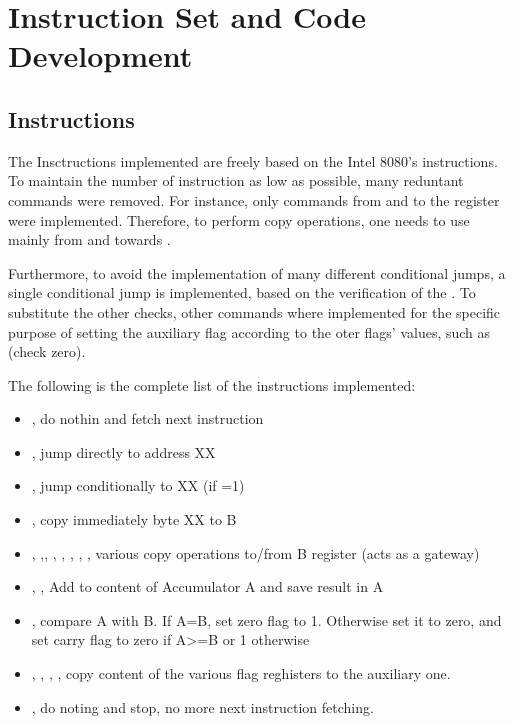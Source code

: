 \section{Instruction Set and Code Development} \label{sec:code}
\subsection{Instructions}
The Insctructions implemented are freely based on the Intel 8080's instructions.
To maintain the number of instruction as low as possible, many reduntant commands were removed.
For instance, only  commands from and to the  register
were implemented. Therefore, to perform copy operations, one needs to use mainly  from and towards .

Furthermore, to avoid the implementation of many different conditional jumps,
a single  conditional jump is implemented, based on the verification of the .
To substitute the other checks, other commands where implemented for the specific purpose of setting the
auxiliary flag according to the oter flags' values, such as  (check zero).

The following is the complete list of the instructions implemented:
\begin{itemize}
    \item {}, do nothin and fetch next instruction
    \item {}, jump directly to address XX
    \item {}, jump conditionally to XX (if =1)
    \item {}, copy immediately byte XX to B
    \item {}, ,, 
    , , , , , 
    various copy operations to/from B register (acts as a gateway)
    \item {}, , Add to content of Accumulator A and save result in A
    \item {}, compare A with B. If A=B, set zero flag to 1. Otherwise set it to zero, and set carry flag to zero if A>=B
    or 1 otherwise
    \item {}, , , , copy content of the various flag reghisters to the auxiliary one.
    \item {}, do noting and stop, no more next instruction fetching.
\end{itemize}


